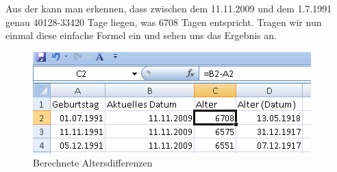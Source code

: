 Aus der  kann man erkennen, dass zwischen dem 11.11.2009 und dem 1.7.1991 genau 40128-33420 Tage liegen, was 6708 Tagen entspricht. Tragen wir nun einmal diese einfache Formel ein und sehen uns das Ergebnis an.
	\begin{figure}[H]
		\centering
		\includegraphics{images/alter2.png}
		\caption{Berechnete Altersdifferenzen}
		\label{fig:alter2}
	\end{figure}


